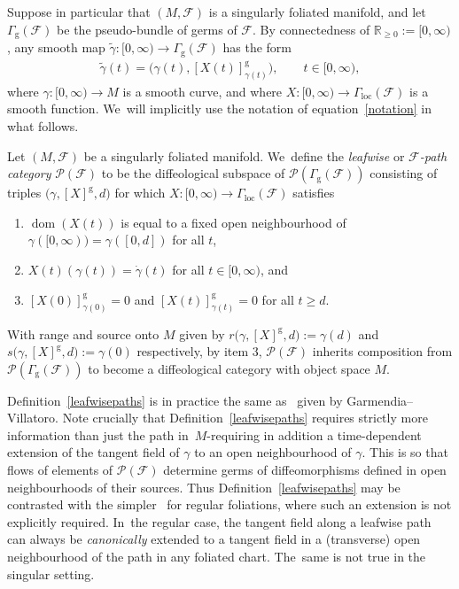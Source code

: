 \documentclass[pdftex]{sigma}
\numberwithin{equation}{section}
\def\loc{\operatorname{loc}}
\def\g{\operatorname{g}}
\def\dom{\operatorname{dom}}
\def\FF{{\mathcal{F}}}
\def\PP{{\mathcal{P}}}
\def\RB{{\mathbb{R}}}
\begin{document}
Suppose in particular that $(M,\FF)$ is a singularly foliated manifold, and let $\Gamma_{\g}(\FF)$ be the pseudo-bundle of germs of $\FF$. By connectedness of $\RB_{\geq0}:=[0,\infty)$, any smooth map $\tilde{\gamma}\colon [0,\infty)\rightarrow\Gamma_{\g}(\FF)$ has the form
\begin{gather}\label{notation}
\tilde{\gamma}(t) = \big(\gamma(t),[X(t)]^{\g}_{\gamma(t)}\big),\qquad t\in[0,\infty),
\end{gather}
where $\gamma\colon [0,\infty)\rightarrow M$ is a smooth curve, and where $X\colon [0,\infty)\rightarrow\Gamma_{\loc}(\FF)$ is a smooth function. We~will implicitly use the notation of equation~\eqref{notation} in what follows.

\begin{Definition}\label{leafwisepaths}
Let $(M,\FF)$ be a singularly foliated manifold. We~define the \textit{leafwise} or \textit{$\FF$-path category} $\PP(\FF)$ to be the diffeological subspace of $\PP(\Gamma_{\g}(\FF))$ consisting of triples $\big(\gamma,[X]^{\g},d\big)$ for which $X\colon [0,\infty)\rightarrow\Gamma_{\loc}(\FF)$ satisfies
\begin{enumerate}\itemsep=0pt
\item[(1)] $\dom(X(t))$ is equal to a fixed open neighbourhood of $\gamma([0,\infty)) = \gamma([0,d])$ for all $t$,
\item[(2)] $X(t)(\gamma(t)) = \dot{\gamma}(t)$ for all $t\in[0,\infty)$, and
\item[(3)] $[X(0)]^{\g}_{\gamma(0)} = 0$ and $[X(t)]^{\g}_{\gamma(t)} = 0$ for all $t\geq d$.
\end{enumerate}
With range and source onto $M$ given by $r\big(\gamma,[X]^{\g},d\big):=\gamma(d)$ and $s\big(\gamma,[X]^{\g},d\big):=\gamma(0)$ respectively, by item 3, $\PP(\FF)$ inherits composition from $\PP(\Gamma_{\g}(\FF))$ to become a diffeological category with object space $M$.
\end{Definition}

Definition~\ref{leafwisepaths} is in practice the same as~\cite[Definition~3.1]{VilGar1} given by Garmendia--Villatoro. Note crucially that Definition~\ref{leafwisepaths} requires strictly more information than just the path in~$M$-re\-quiring in addition a time-dependent extension of the tangent field of $\gamma$ to an open neighbourhood of $\gamma$. This is so that flows of elements of $\PP(\FF)$ determine germs of diffeomorphisms defined in open neighbourhoods of their sources. Thus Definition~\ref{leafwisepaths} may be contrasted with the simpler~\cite[Definition~3.23]{mac3} for regular foliations, where such an extension is not explicitly required. In~the regular case, the tangent field along a leafwise path can always be \textit{canonically} extended to a tangent field in a (transverse) open neighbourhood of the path in any foliated chart. The~same is not true in the singular setting.
\end{document}
